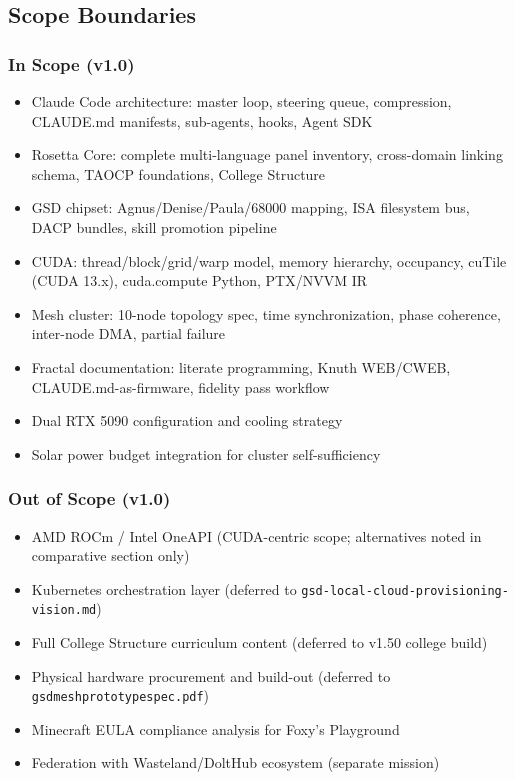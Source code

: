 \documentclass[11pt,letterpaper]{article}
\begin{document}
\subsection{Scope Boundaries}

\subsubsection{In Scope (v1.0)}
\begin{itemize}[leftmargin=1.5em]
  \item Claude Code architecture: master loop, steering queue, compression, CLAUDE.md manifests, sub-agents, hooks, Agent SDK
  \item Rosetta Core: complete multi-language panel inventory, cross-domain linking schema, TAOCP foundations, College Structure
  \item GSD chipset: Agnus/Denise/Paula/68000 mapping, ISA filesystem bus, DACP bundles, skill promotion pipeline
  \item CUDA: thread/block/grid/warp model, memory hierarchy, occupancy, cuTile (CUDA 13.x), cuda.compute Python, PTX/NVVM IR
  \item Mesh cluster: 10-node topology spec, time synchronization, phase coherence, inter-node DMA, partial failure
  \item Fractal documentation: literate programming, Knuth WEB/CWEB, CLAUDE.md-as-firmware, fidelity pass workflow
  \item Dual RTX 5090 configuration and cooling strategy
  \item Solar power budget integration for cluster self-sufficiency
\end{itemize}

\subsubsection{Out of Scope (v1.0)}
\begin{itemize}[leftmargin=1.5em]
  \item AMD ROCm / Intel OneAPI (CUDA-centric scope; alternatives noted in comparative section only)
  \item Kubernetes orchestration layer (deferred to \texttt{gsd-local-cloud-provisioning-vision.md})
  \item Full College Structure curriculum content (deferred to v1.50 college build)
  \item Physical hardware procurement and build-out (deferred to \texttt{gsdmeshprototypespec.pdf})
  \item Minecraft EULA compliance analysis for Foxy's Playground
  \item Federation with Wasteland/DoltHub ecosystem (separate mission)
\end{itemize}
\end{document}
